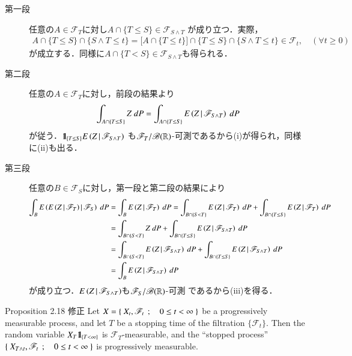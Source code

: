 	\begin{prf}\mbox{}
		\begin{description}
			\item[第一段]
				任意の$A \in \mathscr{F}_T$に対し$A \cap \{T \leq S\} \in \mathscr{F}_{S \wedge T}$
				が成り立つ．実際，
				\begin{align}
					A \cap \{T \leq S\} \cap \{S \wedge T \leq t\}
					= \biggl[ A \cap \{T \leq t\} \biggr] \cap \{T \leq S\} \cap \{S \wedge T \leq t\}
					\in \mathscr{F}_t,
					\quad (\forall t \geq 0)
				\end{align}
				が成立する．同様に$A \cap \{T < S\} \in \mathscr{F}_{S \wedge T}$も得られる．
				
			\item[第二段]
				任意の$A \in \mathscr{F}_T$に対し，前段の結果より
				\begin{align}
					\int_{A \cap \{T \leq S\}} Z\ dP
					= \int_{A \cap \{T \leq S\}} E\left( Z \, \middle|\, \mathscr{F}_{S \wedge T} \right)\ dP
				\end{align}
				が従う．$\mbox{1}\hspace{-0.25em}\mbox{l}_{\{T \leq S\}} E\left( Z \, \middle|\, \mathscr{F}_{S \wedge T} \right)$
				も$\mathscr{F}_T/\mathscr{B}(\mathbb{R})$-可測であるから(i)が得られ，同様に(ii)も出る．
			
			\item[第三段]
				任意の$B \in \mathscr{F}_S$に対し，第一段と第二段の結果により
				\begin{align}
					\int_B \cexp{\cexp{Z}{\mathscr{F}_T}}{\mathscr{F}_S}\ dP
					&= \int_B \cexp{Z}{\mathscr{F}_T}\ dP
					= \int_{B\cap\{S < T\}} \cexp{Z}{\mathscr{F}_T}\ dP
						+ \int_{B\cap\{T \leq S\}} \cexp{Z}{\mathscr{F}_T}\ dP \\
					&= \int_{B \cap \{S < T\}} Z\ dP
						+ \int_{B\cap\{T \leq S\}} \cexp{Z}{\mathscr{F}_{S \wedge T}}\ dP \\
					&= \int_{B \cap \{S < T\}} \cexp{Z}{\mathscr{F}_{S \wedge T}}\ dP
						+ \int_{B\cap\{T \leq S\}} \cexp{Z}{\mathscr{F}_{S \wedge T}}\ dP \\
					&= \int_B \cexp{Z}{\mathscr{F}_{S \wedge T}}\ dP
				\end{align}
				が成り立つ．$E\left( Z \, \middle|\, \mathscr{F}_{S \wedge T} \right)$も$\mathscr{F}_S/\mathscr{B}(\mathbb{R})$-可測
				であるから(iii)を得る．
				\QED
		\end{description}
	\end{prf}
	
	\begin{itembox}[l]{Proposition 2.18 修正}\label{chapter_1_Problem_2_18}
		Let $X = \left\{\ X_t,\mathscr{F}_t\ \, ; \quad 0 \leq t < \infty\ \right\}$ be a progressively measurable 
		process, and let $T$ be a stopping time of the filtration $\{\mathscr{F}_t\}$. 
		Then the random variable $X_T \mbox{1}\hspace{-0.25em}\mbox{l}_{\{T < \infty\}}$ is $\mathscr{F}_T$-measurable, and
		the ``stopped process'' $\left\{\ X_{T \wedge t},\mathscr{F}_t\ \, ; \quad 0 \leq t < \infty\ \right\}$
		is progressively measurable.
	\end{itembox}
	

